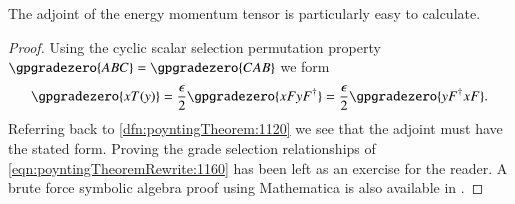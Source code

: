 
The adjoint of the energy momentum tensor is particularly easy to calculate.
\begin{proof}
Using
the cyclic scalar selection permutation property \(\gpgradezero{ABC} = \gpgradezero{CAB}\) we form
\begin{dmath}\label{eqn:poyntingTheoremRewrite:1160}
\gpgradezero{ x T(y) }
=
\frac{\epsilon}{2} \gpgradezero{ x F y F^\dagger }
=
\frac{\epsilon}{2} \gpgradezero{ y F^\dagger x F }.
\end{dmath}
Referring back to \cref{dfn:poyntingTheorem:1120} we see that the adjoint must have the stated form.
Proving the grade selection relationships of \cref{eqn:poyntingTheoremRewrite:1160} has been left as
an exercise for the reader.  A brute force symbolic algebra proof using Mathematica is also available in .
\end{proof}


